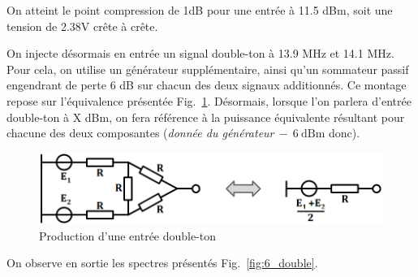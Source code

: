 \documentclass{article}
\begin{document}

On atteint le point compression de 1dB pour une entrée à 11.5 dBm, soit une tension de 2.38V crête à crête.




On injecte désormais en entrée un signal double-ton à 13.9 MHz et 14.1 MHz. Pour cela, on utilise un générateur supplémentaire, ainsi qu'un sommateur passif engendrant de perte 6 dB sur chacun des deux signaux additionnés. Ce montage repose sur l'équivalence présentée Fig.~\ref{fig:eq_double_ton}. Désormais, lorsque l'on parlera d'entrée double-ton à X dBm, on fera référence à la puissance équivalente résultant pour chacune des deux composantes (\textit{donnée du générateur}$~-~6~\mathrm{dBm}$ donc).

\begin{figure}[h]
	\centering
	\includegraphics[width=.5\textwidth]{eq_double_ton}
	\caption{Production d'une entrée double-ton}
	\label{fig:eq_double_ton}
\end{figure}


On observe en sortie les spectres présentés Fig.~\ref{fig:6_double}.
\end{document}
